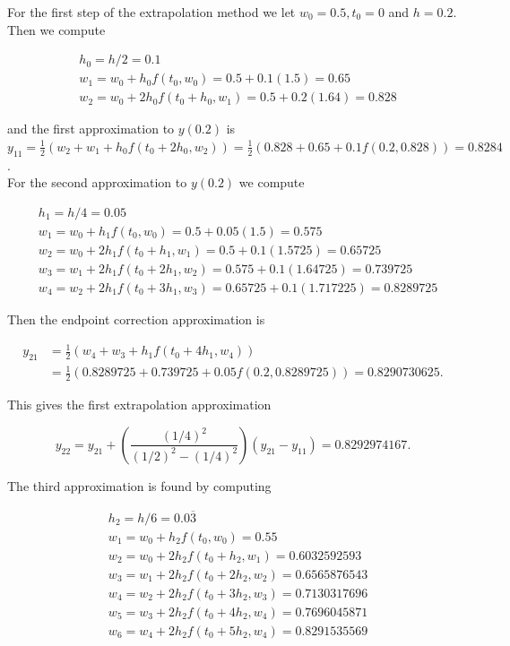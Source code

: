 \begin{mysolution}
For the first step of the extrapolation method we let $w_{0}=0.5, t_{0}=0$ and $h=0.2$. Then we compute

$$
\begin{aligned}
& h_{0}=h / 2=0.1 \\
& w_{1}=w_{0}+h_{0} f\left(t_{0}, w_{0}\right)=0.5+0.1(1.5)=0.65 \\
& w_{2}=w_{0}+2 h_{0} f\left(t_{0}+h_{0}, w_{1}\right)=0.5+0.2(1.64)=0.828
\end{aligned}
$$

and the first approximation to $y(0.2)$ is\\
$y_{11}=\frac{1}{2}\left(w_{2}+w_{1}+h_{0} f\left(t_{0}+2 h_{0}, w_{2}\right)\right)=\frac{1}{2}(0.828+0.65+0.1 f(0.2,0.828))=0.8284$.\\
For the second approximation to $y(0.2)$ we compute

$$
\begin{aligned}
& h_{1}=h / 4=0.05 \\
& w_{1}=w_{0}+h_{1} f\left(t_{0}, w_{0}\right)=0.5+0.05(1.5)=0.575 \\
& w_{2}=w_{0}+2 h_{1} f\left(t_{0}+h_{1}, w_{1}\right)=0.5+0.1(1.5725)=0.65725 \\
& w_{3}=w_{1}+2 h_{1} f\left(t_{0}+2 h_{1}, w_{2}\right)=0.575+0.1(1.64725)=0.739725 \\
& w_{4}=w_{2}+2 h_{1} f\left(t_{0}+3 h_{1}, w_{3}\right)=0.65725+0.1(1.717225)=0.8289725
\end{aligned}
$$

Then the endpoint correction approximation is

$$
\begin{aligned}
y_{21} & =\frac{1}{2}\left(w_{4}+w_{3}+h_{1} f\left(t_{0}+4 h_{1}, w_{4}\right)\right) \\
& =\frac{1}{2}(0.8289725+0.739725+0.05 f(0.2,0.8289725))=0.8290730625 .
\end{aligned}
$$

This gives the first extrapolation approximation

$$
y_{22}=y_{21}+\left(\frac{(1 / 4)^{2}}{(1 / 2)^{2}-(1 / 4)^{2}}\right)\left(y_{21}-y_{11}\right)=0.8292974167 .
$$

The third approximation is found by computing

$$
\begin{aligned}
& h_{2}=h / 6=0.0 \overline{3} \\
& w_{1}=w_{0}+h_{2} f\left(t_{0}, w_{0}\right)=0.55 \\
& w_{2}=w_{0}+2 h_{2} f\left(t_{0}+h_{2}, w_{1}\right)=0.6032592593 \\
& w_{3}=w_{1}+2 h_{2} f\left(t_{0}+2 h_{2}, w_{2}\right)=0.6565876543 \\
& w_{4}=w_{2}+2 h_{2} f\left(t_{0}+3 h_{2}, w_{3}\right)=0.7130317696 \\
& w_{5}=w_{3}+2 h_{2} f\left(t_{0}+4 h_{2}, w_{4}\right)=0.7696045871 \\
& w_{6}=w_{4}+2 h_{2} f\left(t_{0}+5 h_{2}, w_{4}\right)=0.8291535569
\end{aligned}
$$


\end{mysolution}
